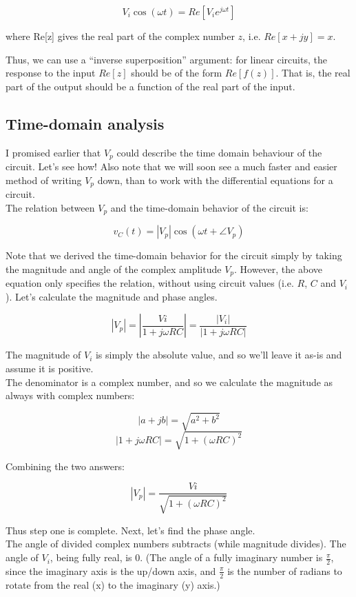 \documentclass[12pt,a4paper]{report}
\begin{document}
\[ V_i \cos{(\omega t)} = Re\left[ V_i e^{j \omega t} \right] \]

where Re[z] gives the real part of the complex number $z$, i.e. $Re[x + jy] = x$.

Thus, we can use a ``inverse superposition'' argument: for linear circuits, the response to the input $Re[z]$ should be of the form $Re[f(z)]$. That is, the real part of the output should be a function of the real part of the input.\\

\subsection{Time-domain analysis}

I promised earlier that $V_p$ could describe the time domain behaviour of the circuit. Let's see how! Also note that we will soon see a much faster and easier method of writing $V_p$ down, than to work with the differential equations for a circuit.\\

The relation between $V_p$ and the time-domain behavior of the circuit is:

\[ v_C(t) = \left| V_p \right| \cos{(\omega t + \angle V_p)} \]

Note that we derived the time-domain behavior for the circuit simply by taking the magnitude and angle of the complex amplitude $V_p$. However, the above equation only specifies the relation, without using circuit values (i.e. $R$, $C$ and $V_i$). Let's calculate the magnitude and phase angles.

\[ | V_p | = \left| \frac{Vi}{1 + j \omega RC} \right| = \frac{|V_i|}{|1 + j \omega RC|} \]

The magnitude of $V_i$ is simply the absolute value, and so we'll leave it as-is and assume it is positive.\\
The denominator is a complex number, and so we calculate the magnitude as always with complex numbers:

\[ |a + jb| = \sqrt{a^2 + b^2} \]
\[ |1 + j \omega R C| = \sqrt{1 + (\omega R C)^2} \]

Combining the two answers:

\[ |V_p| = \frac{Vi}{\sqrt{1 + (\omega R C)^2}} \]

Thus step one is complete. Next, let's find the phase angle.\\
The angle of divided complex numbers subtracts (while magnitude divides). The angle of $V_i$, being fully real, is 0. (The angle of a fully imaginary number is $\displaystyle \frac{\pi}{2}$, since the imaginary axis is the up/down axis, and $\displaystyle \frac{\pi}{2}$ is the number of radians to rotate from the real (x) to the imaginary (y) axis.)\\
\end{document}
